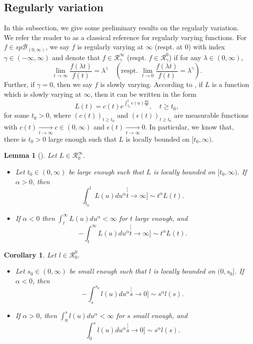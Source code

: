 \documentclass[12pt, a4paper]{amsart}
\newtheorem{lem}[thm]{Lemma}
\newtheorem{cro}[thm]{Corollary}
\theoremstyle{definition}
\numberwithin{equation}{section}
\begin{document}
\subsection{Regularly variation}
\label{sec: Regularly variation}
	In this subsection, we give some preliminary results on the regularly variation.
	We refer the reader to \cite{BinghamGoldieTeugels1989Regular} as a classical reference for regularly varying functions.
	For $f\in sp\mathscr B_{(0,\infty)}$, we say $f$ is regularly varying at $\infty$ (respt. at $0$) with index $\gamma \in (-\infty,\infty)$ and denote that $f\in \mathcal R^\infty_\gamma$ (respt. $f\in \mathcal R^0_\gamma$) if for any $\lambda \in (0,\infty)$,
\[
	\lim_{t\to\infty}\frac{f(\lambda t)}{f(t)}
	= \lambda^\gamma
	\quad (\text{respt. } \lim_{t\to 0}\frac{f(\lambda t)}{f(t)}
	= \lambda^\gamma).
\]
	Further, if $\gamma = 0$,
	then we say $f$ is slowly varying.
	According to \cite[Theorem 1.3.1.]{BinghamGoldieTeugels1989Regular}, if $L$ is a function which is slowly varying at $\infty$, then it can be written in the form
\[
	L(t)
	= c(t) e^{\int_{t_0}^t \epsilon(u) \frac{du}{u}},\quad t\geq t_0,
\]
	for some $t_0>0$, where $(c(t))_{t\geq t_0}$ and $(\epsilon(t))_{t\geq t_0}$ are measurable functions with $c(t) \xrightarrow[t\to \infty]{} c \in (0,\infty)$ and $\epsilon(t) \xrightarrow[t\to \infty]{} 0$.
	In particular, we know that, there is $t_0 > 0$ large enough such that $L$ is locally bounded on $[t_0,\infty)$.

\begin{lem}[{\cite[Propositions 1.5.8. and 1.5.10]{BinghamGoldieTeugels1989Regular}}]
\label{lem: exchange slowly varying function and integration}
	Let $L\in \mathcal R^\infty_0$.
\begin{itemize}
\item
	Let $t_0\in (0,\infty)$ be large enough such that $L$ is locally bounded on $[t_0,\infty)$. If $\alpha>0 $, then
\[
	\int_{t_0}^t L(u)du^\alpha
	\stackrel[t\to \infty]{}{\sim} t^\alpha L(t).
\]
\item
	If $\alpha< 0$ then $\int_t^\infty L(u) du^\alpha < \infty$ for $t$ large enough, and
\[
	-\int_t^\infty L(u)du^\alpha
	\stackrel[t\to \infty]{}{\sim} t^\alpha L(t).
\]
\end{itemize}
\end{lem}

\begin{cro}
\label{cro: power law and ingetration}
	Let $l\in \mathcal R^0_0$.
\begin{itemize}
\item
	Let $s_0\in (0,\infty)$ be small enough such that $l$ is locally bounded on $(0,s_0]$.
	If $\alpha < 0$, then
	\[
	-\int_s^{s_0} l(u)du^\alpha
	\stackrel[s\to 0]{}{\sim} s^{\alpha} l(s).
	\]
\item
	If $\alpha > 0$, then $\int_0^s l(u)du^\alpha<\infty$ for $s$ small enough, and
\[
	\int_0^s l(u)du^\alpha
	\stackrel[s\to 0]{}{\sim} s^{\alpha} l(s).
\]
\end{itemize}
\end{cro}	
\end{document}
